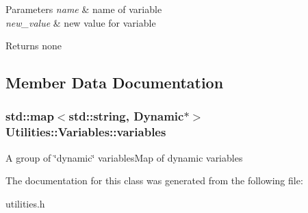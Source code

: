 \begin{DoxyParams}{Parameters}
{\em name} & name of variable \\
\hline
{\em new\+\_\+value} & new value for variable \\
\hline
\end{DoxyParams}
\begin{DoxyReturn}{Returns}
none 
\end{DoxyReturn}


\subsection{Member Data Documentation}
\subsubsection[{\texorpdfstring{variables}{variables}}]{\setlength{\rightskip}{0pt plus 5cm}std\+::map$<$std\+::string, {\bf Dynamic}$\ast$$>$ Utilities\+::\+Variables\+::variables\hspace{0.3cm}{\ttfamily [protected]}}\hypertarget{classUtilities_1_1Variables_acd0a2a9ec3135923b460cdf4e571d478}{}\label{classUtilities_1_1Variables_acd0a2a9ec3135923b460cdf4e571d478}
A group of \char`\"{}dynamic\char`\"{} variables\+Map of dynamic variables 

The documentation for this class was generated from the following file\+:\begin{DoxyCompactItemize}
\item 
utilities.\+h\end{DoxyCompactItemize}
